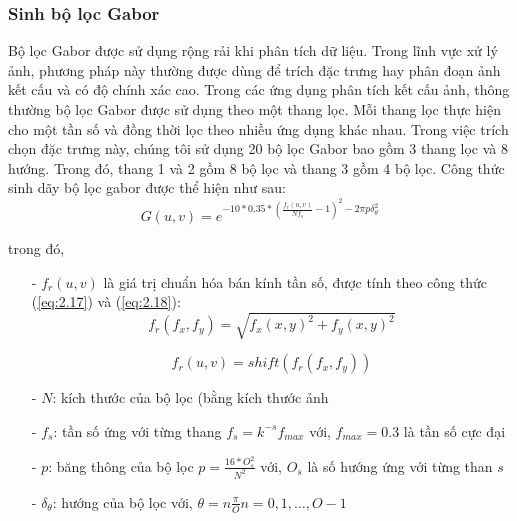 \subsubsection{Sinh bộ lọc Gabor}
Bộ lọc Gabor được sử dụng rộng rải khi phân tích dữ liệu. Trong lĩnh vực xử lý ảnh, phương pháp này thường được dùng để trích đặc trưng hay phân đoạn ảnh kết cấu và có độ chính xác cao. Trong các ứng dụng phân tích kết cấu ảnh, thông thường bộ lọc Gabor được sử dụng theo một thang lọc. Mỗi thang lọc thực hiện cho một tần số và đồng thời lọc theo nhiều ứng dụng khác nhau. Trong việc trích chọn đặc trưng này, chúng tôi sử dụng 20 bộ lọc Gabor bao gồm 3 thang lọc và 8 hướng. Trong đó, thang 1 và 2 gồm 8 bộ lọc và thang 3 gồm 4 bộ lọc. Công thức sinh dãy bộ lọc gabor được thể hiện như sau:
\begin{equation}
G(u, v) = e^{-10*0.35*(\frac{f_r(u, v)}{Nf_s}-1)^2 - 2 \pi p \delta_\theta^2}
\end{equation}

trong đó, \par
\begin{itemize}

\item[-] $f_r(u,v)$ là giá trị chuẩn hóa bán kính tần số, được tính theo công thức (\ref{eq:2.17}) và (\ref{eq:2.18}):
\begin{equation}\label{eq:2.17}
f_r(f_x, f_y) = \sqrt{f_x(x, y)^2 + f_y(x, y)^2} 
\end{equation}

\begin{equation}\label{eq:2.18}
f_r(u, v) = shift(f_r(f_x, f_y))
\end{equation}

\item[-] $N$: kích thước của bộ lọc (bằng kích thước ảnh\par
\item[-] $f_s$: tần số ứng với từng thang $f_s = k^{-s}f_{max}$ với, $f_{max} = 0.3$ là tần số cực đại\par
\item[-] $p$: băng thông của bộ lọc $p = \frac{16*O_s^2}{N^2}$ với, $O_s$ là số hướng ứng với từng than $s$
\item[-] $\delta_\theta$: hướng của bộ lọc với, $\theta = n\frac{\pi}{O}n=0, 1, \dots, O-1$
\end{itemize}

